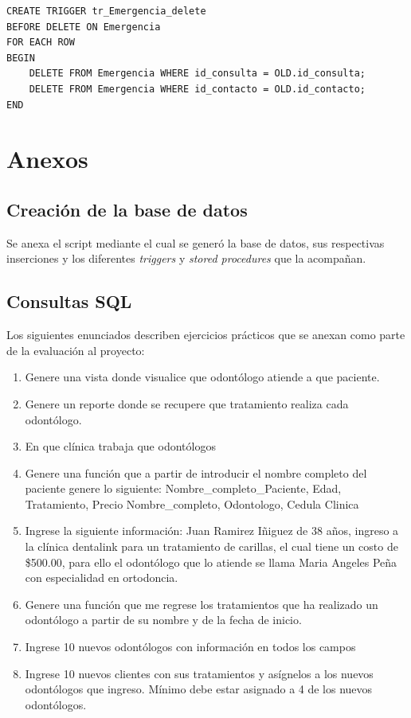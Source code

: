\documentclass[a4paper,12pt]{article}
\begin{document}
\begin{verbatim}
CREATE TRIGGER tr_Emergencia_delete
BEFORE DELETE ON Emergencia
FOR EACH ROW
BEGIN
    DELETE FROM Emergencia WHERE id_consulta = OLD.id_consulta;
    DELETE FROM Emergencia WHERE id_contacto = OLD.id_contacto;
END
\end{verbatim}

\section{Anexos}
\subsection{Creación de la base de datos}
Se anexa el script mediante el cual se generó la base de datos, sus respectivas inserciones y los diferentes \textit{triggers} y \textit{stored procedures} que la acompañan.\\

\newpage

\subsection{Consultas SQL}

Los siguientes enunciados describen ejercicios prácticos que se anexan como parte de la evaluación al proyecto:\\

\begin{enumerate}
	\item Genere una vista donde visualice que odontólogo atiende a que paciente.
	\item Genere un reporte donde se recupere que tratamiento realiza cada odontólogo.
	\item En que clínica trabaja que odontólogos 
	\item Genere una función que a partir de introducir el nombre completo del paciente genere lo siguiente:
Nombre\_completo\_Paciente, Edad, Tratamiento, Precio Nombre\_completo, Odontologo, Cedula Clinica
	\item Ingrese la siguiente información: Juan Ramirez Iñiguez de 38 años, ingreso a la clínica dentalink para un tratamiento de carillas, el cual tiene un costo de \$500.00, para ello el odontólogo que lo atiende se llama Maria Angeles Peña con especialidad en ortodoncia. 
	\item Genere una función que me regrese los tratamientos que ha realizado un odontólogo a partir de su nombre y de la fecha de inicio.
	\item Ingrese 10 nuevos odontólogos con información en todos los campos
	\item Ingrese 10 nuevos clientes con sus tratamientos y asígnelos a los nuevos odontólogos que ingreso. Mínimo debe estar asignado a 4 de los nuevos odontólogos.
\end{enumerate}
\end{document}
